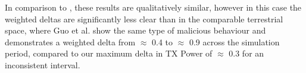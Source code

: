 \documentclass[conference]{IEEEtran}
\begin{document}
In comparison to \cite{Guo11}, these results are qualitatively similar, however in this case the weighted deltas are significantly less clear than in the comparable terrestrial space, where Guo et al. show the same type of malicious behaviour and demonstrates a weighted delta from $\approx$ 0.4 to $\approx$ 0.9 across the simulation period, compared to our maximum delta in TX Power of $\approx$ 0.3 for an inconsistent interval.
\begin{figure}[h]
  \centering
  \newline

\end{figure}
\end{document}
